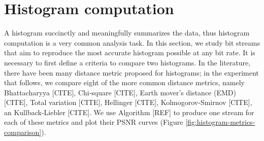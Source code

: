 
\section{Histogram computation}

A histogram succinctly and meaningfully summarizes the data, thus histogram computation is a very
common analysis task. In this section, we study bit streams that aim to reproduce the most accurate
histogram possible at any bit rate. It is necessary to first define a criteria to compare two
histograms. In the literature, there have been many distance metric proposed for histograms; in the
experiment that follows, we compare eight of the more common distance metrics, namely Bhattacharyya
[CITE], Chi-square [CITE], Earth mover's distance (EMD) [CITE], Total variation [CITE], Hellinger
[CITE], Kolmogorov-Smirnov [CITE], an Kullback-Liebler [CITE]. We use Algorithm [REF] to produce one
stream for each of these metrics and plot their PSNR curves (Figure
\ref{fig:histogram-metrics-comparison}). 

